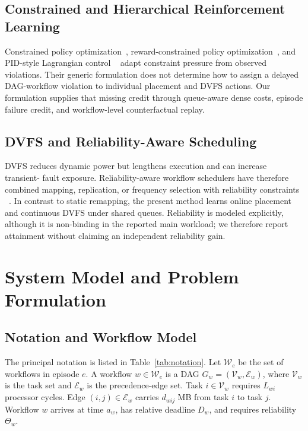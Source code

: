 \documentclass[lettersize,journal]{IEEEtran}
\begin{document}
\subsection{Constrained and Hierarchical Reinforcement Learning}
Constrained policy optimization~\cite{achiam2017}, reward-constrained policy
optimization~\cite{tessler2019}, and PID-style Lagrangian control
~\cite{stooke2020} adapt constraint pressure from observed violations. Their
generic formulation does not determine how to assign a delayed DAG-workflow
violation to individual placement and DVFS actions. Our formulation supplies
that missing credit through queue-aware dense costs, episode failure credit,
and workflow-level counterfactual replay.

\subsection{DVFS and Reliability-Aware Scheduling}
DVFS reduces dynamic power but lengthens execution and can increase transient-
fault exposure. Reliability-aware workflow schedulers have therefore combined
mapping, replication, or frequency selection with reliability constraints
~\cite{zhang2017,wu2018,hassan2020,wu2023}. In contrast to static remapping, the
present method learns online placement and continuous DVFS under shared queues.
Reliability is modeled explicitly, although it is non-binding in the reported
main workload; we therefore report attainment without claiming an independent
reliability gain.

\section{System Model and Problem Formulation}
\label{sec:model}

\subsection{Notation and Workflow Model}
The principal notation is listed in Table~\ref{tab:notation}. Let
$\mathcal{W}_e$ be the set of workflows in episode $e$. A workflow
$w\in\mathcal{W}_e$ is a DAG $G_w=(\mathcal{V}_w,\mathcal{E}_w)$, where
$\mathcal{V}_w$ is the task set and $\mathcal{E}_w$ is the precedence-edge set.
Task $i\in\mathcal{V}_w$ requires $L_{wi}$ processor cycles. Edge
$(i,j)\in\mathcal{E}_w$ carries $d_{wij}$ MB from task $i$ to task $j$.
Workflow $w$ arrives at time $a_w$, has relative deadline $D_w$, and requires
reliability $\Theta_w$.
\end{document}
